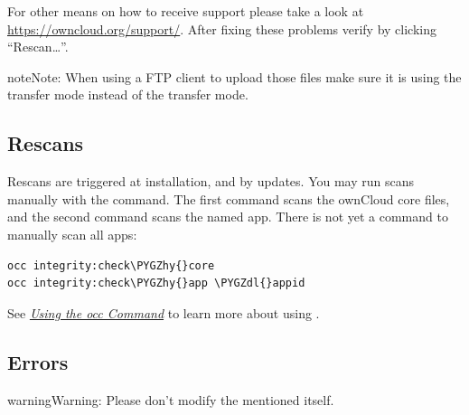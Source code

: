 \documentclass[letterpaper,10pt,english]{sphinxmanual}
\def\PYGZdl{\char`\$}
\def\PYGZhy{\char`\-}
\begin{document}
For other means on how to receive support please take a look at
\href{https://owncloud.org/support/}{https://owncloud.org/support/}. After fixing these problems verify by clicking
``Rescan…''.

\begin{notice}{note}{Note:}
When using a FTP client to upload those files make sure it is using the
 transfer mode instead of the  transfer mode.
\end{notice}


\subsection{Rescans}
\label{issues/code_signing:rescans}\label{issues/code_signing:rescans-label}
Rescans are triggered at installation, and by updates. You may run scans manually with the  command. The first command scans the ownCloud core files, and the second command scans the named app. There is not yet a command to manually scan all apps:

\begin{Verbatim}[commandchars=\\\{\}]
occ integrity:check\PYGZhy{}core
occ integrity:check\PYGZhy{}app \PYGZdl{}appid
\end{Verbatim}

See {\hyperref[configuration_server/occ_command::doc]{\emph{\emph{Using the occ Command}}}} to learn more about using .


\subsection{Errors}
\label{issues/code_signing:errors}
\begin{notice}{warning}{Warning:}
Please don't modify the mentioned  itself.
\end{notice}
\end{document}
